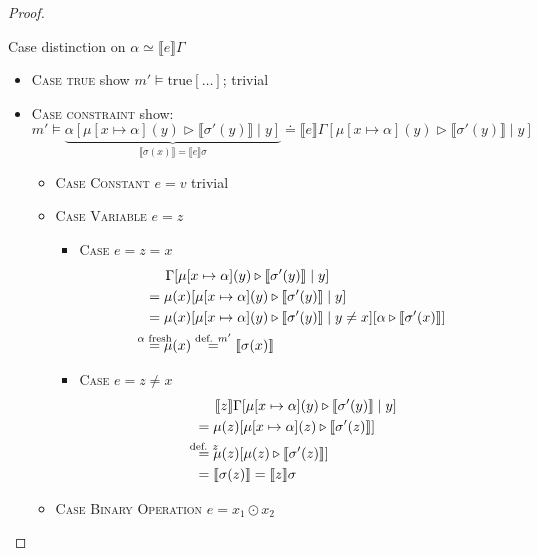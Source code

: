 \documentclass[twoside, english]{sdqthesis}
\newcommand{\bbracket}[1]{\llbracket #1 \rrbracket}
\newcommand{\tr}[0]{\triangleright}
\theoremstyle{definition}
\begin{document}
\begin{proof}
\begin{itemize}
      Case distinction on $\alpha \simeq \bbracket{e}\Gamma$

      \begin{itemize}
        \item \textsc{Case true} show $m' \vDash \text{true}[\dots]$; trivial
        \item \textsc{Case constraint} show:
          $$ m' \vDash 
            \underbrace{\alpha[\mu[x\mapsto \alpha](y) \tr \bbracket{\sigma'(y)} \mid y]}_{\bbracket{\sigma(x)}=\bbracket{e}\sigma}
            \doteq 
            \bbracket{e}\Gamma[\mu[x\mapsto \alpha](y) \tr \bbracket{\sigma'(y)} \mid y]
          $$
          \begin{itemize}
            \item \textsc{Case Constant} $e=v$ trivial
            \item \textsc{Case Variable} $e=z$
              \begin{itemize}
                \item \textsc{Case $e=z=x$} 
                  \begin{align*}
                    &\phantom{=}\ \ \Gamma[\mu[x\mapsto \alpha](y) \tr \bbracket{\sigma'(y)} \mid y]
                    \\ &= \mu(x)[\mu[x\mapsto \alpha](y) \tr \bbracket{\sigma'(y)} \mid y]
                    \\ &= \mu(x)[\mu[x\mapsto \alpha](y) \tr \bbracket{\sigma'(y)} \mid y \neq x][\alpha \tr \bbracket{\sigma'(x)} ]
                    \\ &\overset{\mathclap{\alpha \text{ fresh}}}{=} \mu(x) 
                      \overset{\text{def. } m'}{=} \bbracket{\sigma(x)}
                  \end{align*}
                \item \textsc{Case $e = z \neq x$}
                  \begin{align*}
                    &\phantom{=}\ \ \bbracket{z}\Gamma[\mu[x\mapsto \alpha](y) \tr \bbracket{\sigma'(y)} \mid y]
                    \\ &= \mu(z)[\mu[x\mapsto \alpha](z) \tr \bbracket{\sigma'(z)}]
                    \\ &\overset{\mathclap{\text{def. } z}}{=} \mu(z)[\mu(z) \tr \bbracket{\sigma'(z)}]
                    \\ &=\bbracket{\sigma(z)} = \bbracket{z}\sigma
                  \end{align*}
              \end{itemize}
            \item \textsc{Case Binary Operation} $e = x_1 \odot x_2$

\end{itemize}
\end{itemize}
\end{itemize}
\end{proof}
\end{document}
